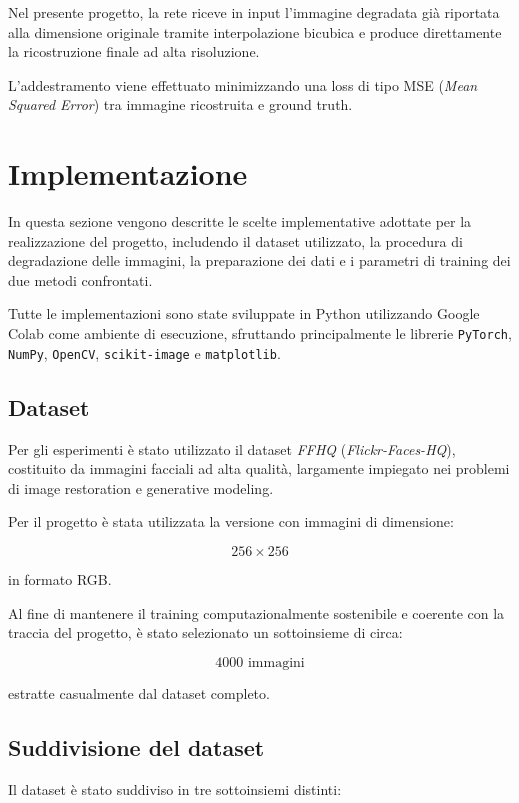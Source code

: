 \documentclass{article}
\begin{document}
Nel presente progetto, la rete riceve in input l’immagine degradata già riportata alla dimensione originale tramite interpolazione bicubica e produce direttamente la ricostruzione finale ad alta risoluzione.

L’addestramento viene effettuato minimizzando una loss di tipo MSE (\textit{Mean Squared Error}) tra immagine ricostruita e ground truth.

\newpage
\section{Implementazione}

In questa sezione vengono descritte le scelte implementative adottate per la realizzazione del progetto, includendo il dataset utilizzato, la procedura di degradazione delle immagini, la preparazione dei dati e i parametri di training dei due metodi confrontati.

Tutte le implementazioni sono state sviluppate in Python utilizzando Google Colab come ambiente di esecuzione, sfruttando principalmente le librerie \texttt{PyTorch}, \texttt{NumPy}, \texttt{OpenCV}, \texttt{scikit-image} e \texttt{matplotlib}.

\subsection{Dataset}

Per gli esperimenti è stato utilizzato il dataset \textit{FFHQ} (\textit{Flickr-Faces-HQ}), costituito da immagini facciali ad alta qualità, largamente impiegato nei problemi di image restoration e generative modeling.

Per il progetto è stata utilizzata la versione con immagini di dimensione:

\[
256 \times 256
\]

in formato RGB.

Al fine di mantenere il training computazionalmente sostenibile e coerente con la traccia del progetto, è stato selezionato un sottoinsieme di circa:

\[
4000 \text{ immagini}
\]

estratte casualmente dal dataset completo.

\subsection{Suddivisione del dataset}

Il dataset è stato suddiviso in tre sottoinsiemi distinti:
\end{document}
